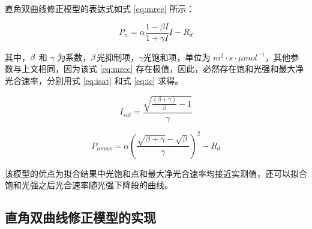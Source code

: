 \documentclass[]{krantz}
\theoremstyle{definition}
\theoremstyle{definition}
\theoremstyle{definition}
\theoremstyle{remark}
\begin{document}
\citet{YEZiPiao2010} 直角双曲线修正模型的表达式如式 \eqref{eq:mrec} 所示：

\begin{equation}
P_{n} = \alpha \frac{1-\beta I}{1+\gamma I} I - R_{d}
\label{eq:mrec}
\end{equation}

其中，\(\text{\ensuremath{\beta}}\) 和 \(\gamma\)
为系数，\(\text{\ensuremath{\beta}}\)光抑制项，\(\gamma\)光饱和项，单位为
\(m^{2}\cdot s\cdot\mu mol^{-1}\)，其他参数与上文相同，因为该式
\eqref{eq:mrec} 存在极值，因此，必然存在饱和光强和最大净光合速率，分别用式
\eqref{eq:isat} 和式 \eqref{eq:ic} 求得。

\begin{equation}
I_{sat} = \frac{\sqrt{\frac{(\beta+\gamma)}{\beta}-1}}{\gamma}
\label{eq:isat}
\end{equation}

\begin{equation}
P_{nmax} = \alpha\left(\frac{\sqrt{\beta+\gamma}-\sqrt{\beta}}{\gamma}\right)^{2}-R_{d}
\label{eq:ic}
\end{equation}

该模型的优点为拟合结果中光饱和点和最大净光合速率均接近实测值，还可以拟合饱和光强之后光合速率随光强下降段的曲线。

\subsection{直角双曲线修正模型的实现}
\end{document}
